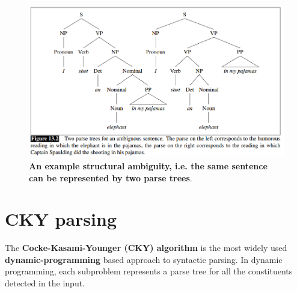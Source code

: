 \documentclass[11pt]{article}
\begin{document}
\begin{figure}
\begin{minipage}[t]{1\linewidth}
  \centering
  \centerline{\includegraphics[scale = 0.5]{ambiguitiy_parse.png}}
\end{minipage}
\caption{\footnotesize{\textbf{An example structural ambiguity, i.e. the same sentence can be represented by two parse trees}.}}
\label{fig: structure_ambiguity}
\end{figure}

\section{CKY parsing}
The \textbf{Cocke-Kasami-Younger (CKY) algorithm} is  the most widely used \textbf{dynamic-programming} based approach to syntactic parsing. In dynamic programming, each subproblem represents a parse tree for all the constituents detected in the input.
\end{document}
